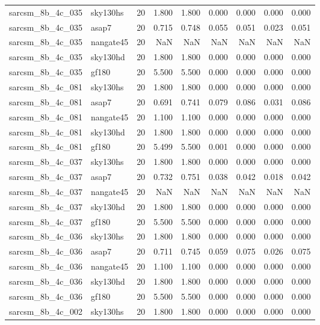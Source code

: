\begin{tabular}{llrrrrrrr}
sarcsm\_8b\_4c\_035 & sky130hs & 20 & 1.800 & 1.800 & 0.000 & 0.000 & 0.000 & 0.000 \\
sarcsm\_8b\_4c\_035 & asap7 & 20 & 0.715 & 0.748 & 0.055 & 0.051 & 0.023 & 0.051 \\
sarcsm\_8b\_4c\_035 & nangate45 & 20 & NaN & NaN & NaN & NaN & NaN & NaN \\
sarcsm\_8b\_4c\_035 & sky130hd & 20 & 1.800 & 1.800 & 0.000 & 0.000 & 0.000 & 0.000 \\
sarcsm\_8b\_4c\_035 & gf180 & 20 & 5.500 & 5.500 & 0.000 & 0.000 & 0.000 & 0.000 \\
sarcsm\_8b\_4c\_081 & sky130hs & 20 & 1.800 & 1.800 & 0.000 & 0.000 & 0.000 & 0.000 \\
sarcsm\_8b\_4c\_081 & asap7 & 20 & 0.691 & 0.741 & 0.079 & 0.086 & 0.031 & 0.086 \\
sarcsm\_8b\_4c\_081 & nangate45 & 20 & 1.100 & 1.100 & 0.000 & 0.000 & 0.000 & 0.000 \\
sarcsm\_8b\_4c\_081 & sky130hd & 20 & 1.800 & 1.800 & 0.000 & 0.000 & 0.000 & 0.000 \\
sarcsm\_8b\_4c\_081 & gf180 & 20 & 5.499 & 5.500 & 0.001 & 0.000 & 0.000 & 0.000 \\
sarcsm\_8b\_4c\_037 & sky130hs & 20 & 1.800 & 1.800 & 0.000 & 0.000 & 0.000 & 0.000 \\
sarcsm\_8b\_4c\_037 & asap7 & 20 & 0.732 & 0.751 & 0.038 & 0.042 & 0.018 & 0.042 \\
sarcsm\_8b\_4c\_037 & nangate45 & 20 & NaN & NaN & NaN & NaN & NaN & NaN \\
sarcsm\_8b\_4c\_037 & sky130hd & 20 & 1.800 & 1.800 & 0.000 & 0.000 & 0.000 & 0.000 \\
sarcsm\_8b\_4c\_037 & gf180 & 20 & 5.500 & 5.500 & 0.000 & 0.000 & 0.000 & 0.000 \\
sarcsm\_8b\_4c\_036 & sky130hs & 20 & 1.800 & 1.800 & 0.000 & 0.000 & 0.000 & 0.000 \\
sarcsm\_8b\_4c\_036 & asap7 & 20 & 0.711 & 0.745 & 0.059 & 0.075 & 0.026 & 0.075 \\
sarcsm\_8b\_4c\_036 & nangate45 & 20 & 1.100 & 1.100 & 0.000 & 0.000 & 0.000 & 0.000 \\
sarcsm\_8b\_4c\_036 & sky130hd & 20 & 1.800 & 1.800 & 0.000 & 0.000 & 0.000 & 0.000 \\
sarcsm\_8b\_4c\_036 & gf180 & 20 & 5.500 & 5.500 & 0.000 & 0.000 & 0.000 & 0.000 \\
sarcsm\_8b\_4c\_002 & sky130hs & 20 & 1.800 & 1.800 & 0.000 & 0.000 & 0.000 & 0.000 \\

\end{tabular}
